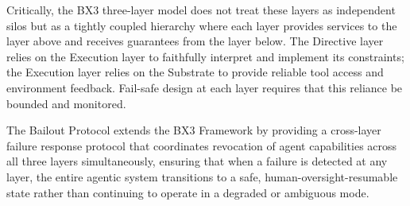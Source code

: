 Critically, the BX3 three-layer model does not treat these layers as independent silos but as a tightly coupled hierarchy where each layer provides services to the layer above and receives guarantees from the layer below. The Directive layer relies on the Execution layer to faithfully interpret and implement its constraints; the Execution layer relies on the Substrate to provide reliable tool access and environment feedback. Fail-safe design at each layer requires that this reliance be bounded and monitored.

The Bailout Protocol extends the BX3 Framework by providing a cross-layer failure response protocol that coordinates revocation of agent capabilities across all three layers simultaneously, ensuring that when a failure is detected at any layer, the entire agentic system transitions to a safe, human-oversight-resumable state rather than continuing to operate in a degraded or ambiguous mode.